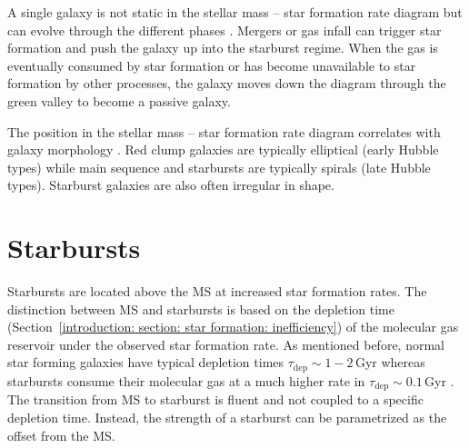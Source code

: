 A single galaxy is not static in the stellar mass -- star formation rate diagram but can evolve through the different phases \citep[e.g.][]{2006MNRAS.368....2D,2018MNRAS.474.2039E}. Mergers or gas infall can trigger star formation and push the galaxy up into the starburst regime. When the gas is eventually consumed by star formation or has become unavailable to star formation by other processes, the galaxy moves down the diagram through the green valley to become a passive galaxy.

The position in the stellar mass -- star formation rate diagram correlates with galaxy morphology \citep[e.g.][]{2004MNRAS.351.1151B}. Red clump galaxies are typically elliptical (early Hubble types) while main sequence and starbursts are typically spirals (late Hubble types). Starburst galaxies are also often irregular in shape.



\section{Starbursts}
\label{introdution: section: star formation: starbursts}

Starbursts are located above the MS at increased star formation rates. The distinction between MS and starbursts is based on the depletion time (Section~\ref{introduction: section: star formation: inefficiency}) of the molecular gas reservoir under the observed star formation rate. As mentioned before, normal star forming galaxies have typical depletion times $\tau_\mathrm{dep} \sim 1-2$\,Gyr \citep[e.g.][]{Leroy:2008jk} whereas starbursts consume their molecular gas at a much higher rate in $\tau_\mathrm{dep} \sim 0.1$\,Gyr \citep[e.g.][]{Kennicutt:1998id,2008AJ....136.2846B}.
The transition from MS to starburst is fluent and not coupled to a specific depletion time. Instead, the strength of a starburst can be parametrized as the offset from the MS.

